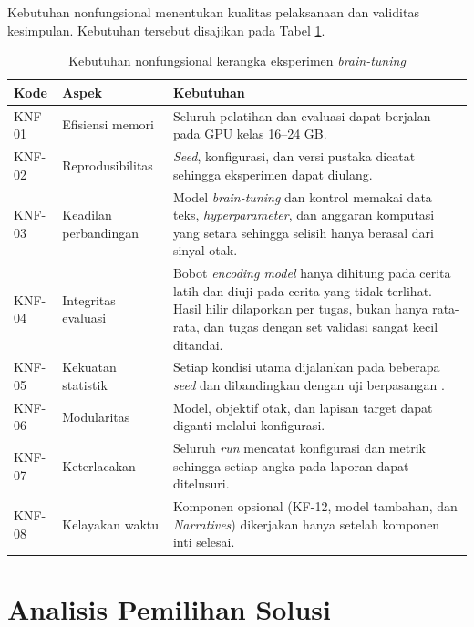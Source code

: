   Kebutuhan nonfungsional menentukan kualitas pelaksanaan dan validitas kesimpulan. Kebutuhan tersebut disajikan pada Tabel \ref{tab:am_knf}.

  \begin{table}[h]
    \centering
    \caption{Kebutuhan nonfungsional kerangka eksperimen \textit{brain-tuning}}
    \label{tab:am_knf}
    \small
    \begin{tabularx}{\textwidth}{p{1.5cm} p{3.0cm} p{7.0cm}}
      \hline
      \textbf{Kode} & \textbf{Aspek} & \textbf{Kebutuhan} \\
      \hline
      KNF-01 & Efisiensi memori & Seluruh pelatihan dan evaluasi dapat berjalan pada GPU kelas 16--24 GB. \\
      KNF-02 & Reprodusibilitas & \textit{Seed}, konfigurasi, dan versi pustaka dicatat sehingga eksperimen dapat diulang. \\
      KNF-03 & Keadilan perbandingan & Model \textit{brain-tuning} dan kontrol memakai data teks, \textit{hyperparameter}, dan anggaran komputasi yang setara sehingga selisih hanya berasal dari sinyal otak. \\
      KNF-04 & Integritas evaluasi & Bobot \textit{encoding model} hanya dihitung pada cerita latih dan diuji pada cerita yang tidak terlihat. Hasil hilir dilaporkan per tugas, bukan hanya rata-rata, dan tugas dengan set validasi sangat kecil ditandai. \\
      KNF-05 & Kekuatan statistik & Setiap kondisi utama dijalankan pada beberapa \textit{seed} dan dibandingkan dengan uji berpasangan \autocite{xiao2026beyond}. \\
      KNF-06 & Modularitas & Model, objektif otak, dan lapisan target dapat diganti melalui konfigurasi. \\
      KNF-07 & Keterlacakan & Seluruh \textit{run} mencatat konfigurasi dan metrik sehingga setiap angka pada laporan dapat ditelusuri. \\
      KNF-08 & Kelayakan waktu & Komponen opsional (KF-12, model tambahan, dan \textit{Narratives}) dikerjakan hanya setelah komponen inti selesai. \\
      \hline
    \end{tabularx}
  \end{table}

  \section{Analisis Pemilihan Solusi}
  \label{chap:am_solusi}

